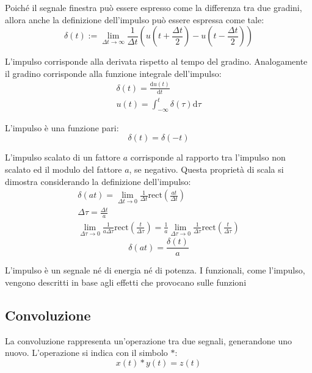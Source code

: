 \documentclass{article}
\newcommand{\rect}{\mathrm{rect}}
\newcommand{\df}{\mathrm{d}}
\numberwithin{equation}{subsection}
\begin{document}
Poiché il segnale finestra può essere espresso come la differenza tra due gradini, allora anche la definizione dell'impulso può essere espressa come tale:
\begin{equation*}
    \delta(t):=\lim_{\Delta t\to\infty}\frac{1}{\Delta t}\left(u\left(t+\frac{\Delta t}{2}\right)-u\left(t-\frac{\Delta t}{2}\right)\right)
\end{equation*}



L'impulso corrisponde alla derivata rispetto al tempo del gradino. Analogamente il gradino corrisponde alla funzione integrale dell'impulso:
\begin{gather}
    \delta(t)=\displaystyle\frac{\df u(t)}{\df t}\\
    u(t)=\displaystyle\int_{-\infty}^t\delta(\tau)\df\tau
\end{gather}



L'impulso è una funzione pari:
\begin{equation*}
    \delta(t)=\delta(-t)
\end{equation*}



L'impulso scalato di un fattore $a$ corrisponde al rapporto tra l'impulso non scalato ed il modulo del fattore $a$, se negativo. Questa proprietà di scala si dimostra 
considerando la definizione dell'impulso: 
\begin{gather*}
    \delta(at)=\displaystyle\lim_{\Delta t\to0}\frac{1}{\Delta t}\rect\left(\frac{at}{\Delta t}\right)\\
    \Delta\tau=\displaystyle\frac{\Delta t}{a}\\
    \displaystyle\lim_{\Delta\tau\to0}\frac{1}{a\Delta\tau}\rect\left(\frac{t}{\Delta\tau}\right)=\frac{1}{a}\lim_{\Delta\tau\to0}\frac{1}{\Delta\tau}\rect\left(\frac{t}{\Delta\tau}\right)
\end{gather*}
\begin{equation}
    \delta(at)=\displaystyle\frac{\delta(t)}{a}
\end{equation}

L'impulso è un segnale né di energia né di potenza. I funzionali, come l'impulso, vengono descritti in base agli effetti che provocano sulle funzioni

\subsection{Convoluzione}

La convoluzione rappresenta un'operazione tra due segnali, generandone uno nuovo. L'operazione si indica con il simbolo $*$:
\begin{equation*}
    x(t)*y(t)=z(t)
\end{equation*}
\end{document}
